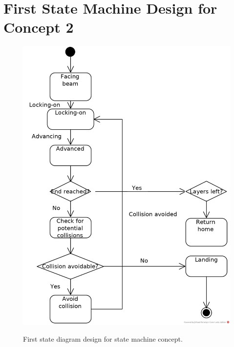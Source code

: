 \chapter{First State Machine Design for Concept 2}
\label{app:bar_states_simple}
\begin{figure}[h]
	\centering
	\includegraphics[height=0.6\textheight]{img/Bar_following_states_simple}
	\label{fig:bar_states_simple}
	\caption{First state diagram design for state machine concept.}
\end{figure}